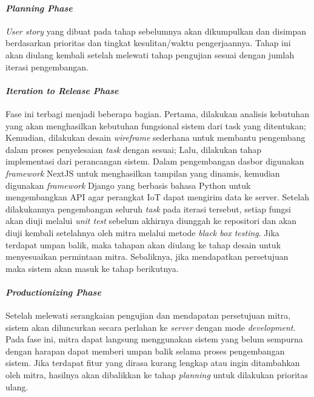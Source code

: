     \newpage

    \paragraph{\textit{Planning Phase}}

    \textit{User story} yang dibuat pada tahap sebelumnya akan dikumpulkan dan disimpan berdasarkan prioritas dan tingkat kesulitan/waktu pengerjaannya. Tahap ini akan diulang kembali setelah melewati tahap pengujian sesuai dengan jumlah iterasi pengembangan.

    \paragraph{\textit{Iteration to Release Phase}}

    Fase ini terbagi menjadi beberapa bagian. Pertama, dilakukan analisis kebutuhan yang akan menghasilkan kebutuhan fungsional sistem dari task yang ditentukan; Kemudian, dilakukan desain \textit{wireframe} sederhana untuk membantu pengembang dalam proses penyelesaian \textit{task} dengan sesuai; Lalu, dilakukan tahap implementasi dari perancangan sistem. Dalam pengembangan dasbor digunakan \textit{framework} NextJS untuk menghasilkan tampilan yang dinamis, kemudian digunakan \textit{framework} Django yang berbasis bahasa Python untuk mengembangkan API agar perangkat IoT dapat mengirim data ke server. Setelah dilakukannya pengembangan seluruh \textit{task} pada iterasi tersebut, setiap fungsi akan diuji melalui \textit{unit test} sebelum akhirnya diunggah ke repositori dan akan diuji kembali setelahnya oleh mitra melalui metode \textit{black box testing}. Jika terdapat umpan balik, maka tahapan akan diulang ke tahap desain untuk menyesuaikan permintaan mitra. Sebaliknya, jika mendapatkan persetujuan maka sistem akan masuk ke tahap berikutnya.

    \paragraph{\textit{Productionizing Phase}}

    Setelah melewati serangkaian pengujian dan mendapatan persetujuan mitra, sistem akan diluncurkan secara perlahan ke \textit{server} dengan mode \textit{development}. Pada fase ini, mitra dapat langsung menggunakan sistem yang belum sempurna dengan harapan dapat memberi umpan balik selama proses pengembangan sistem. Jika terdapat fitur yang dirasa kurang lengkap atau ingin ditambahkan oleh mitra, hasilnya akan dibalikkan ke tahap \textit{planning} untuk dilakukan prioritas ulang.

